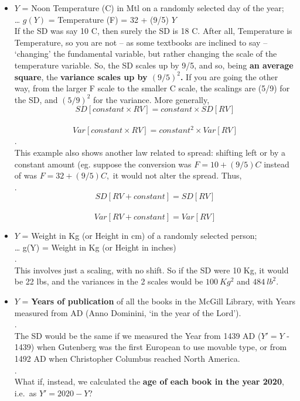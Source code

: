 \documentclass[]{book}
\begin{document}
\begin{itemize}
\item
  \(Y\) = Noon Temperature (C) in Mtl on a randomly selected day of the year;\\
  \ldots{} \(g(Y)\) = Temperature (F) = 32 + (9/5) \(Y\)\\
  If the SD was say 10 C, then surely the SD is 18 C. After all, Temperature is Temperature, so you are not -- as some textbooks are inclined to say -- `changing' the fundamental variable, but rather changing the scale of the temperature variable. So, the SD scales up by 9/5, and so, being \textbf{an average square}, the \textbf{variance scales up by \((9/5)^2\).} If you are going the other way, from the larger F scale to the smaller C scale, the scalings are (5/9) for the SD, and \((5/9)^2\) for the variance. More generally,\\
  \[SD[constant  \times RV] = constant  \times SD[RV]\]\\
  \[Var[constant  \times RV] = constant^2  \times Var[RV]\]
  .\\
  This example also shows another law related to spread: shifting left or by a constant amount (eg. suppose the conversion was \(F = 10 + (9/5)C\) instead of was \(F = 32 + (9/5)C,\) it would not alter the spread. Thus,\\
  .\\
  \[SD[ RV + constant ] = SD[RV]\]\\
  \[Var[ RV + constant ] = Var[RV]\]
\item
  \(Y\) = Weight in Kg (or Height in cm) of a randomly selected person;\\
  \ldots{} g(Y) = Weight in Kg (or Height in inches)\\
  .\\
  This involves just a scaling, with no shift. So if the SD were 10 Kg, it would be 22 lbs, and the variances in the 2 scales would be \(100 \ Kg^2\) and \(484 \ lb^2\).
\item
  \(Y\) = \textbf{Years of publication} of all the books in the McGill Library, with Years measured from AD (Anno Dominini, `in the year of the Lord').\\
  .\\
  The SD would be the same if we measured the Year from 1439 AD (\(Y' = Y\) - 1439) when Gutenberg was the first European to use movable type, or from 1492 AD when Christopher Columbus reached North America.\\
  .\\
  What if, instead, we calculated the \textbf{age of each book in the year 2020}, i.e.~as \(Y' = 2020 - Y\)?\\

\end{itemize}
\end{document}
